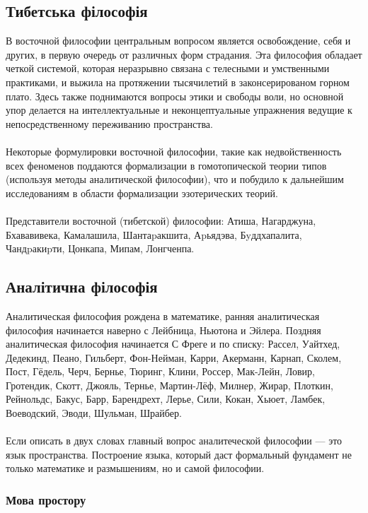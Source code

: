\subsection{Тибетська філософія}

В восточной философии центральным вопросом является освобождение, себя и других, в первую очередь от различных форм страдания. Эта философия обладает четкой системой, которая неразрывно связана с телесными и умственными практиками, и выжила на протяжении тысячилетий в законсерированом горном плато. Здесь также поднимаются вопросы этики и свободы воли, но основной упор делается на интеллектуальные и неконцептуальные упражнения ведущие к непосредственному переживанию пространства.
\\
\\
Некоторые формулировки восточной философии, такие как недвойственность всех феноменов поддаются формализации в гомотопической теории типов (используя методы аналитической философии), что и побудило к дальнейшим исследованиям в области формализации эзотерических теорий.
\\
\\
Представители восточной (тибетской) философии: Атиша, Нагарджуна, Бхававивека, Камалашила, Шантаpакшита, Аpьядэва, Бyддхапалита, Чандpакиpти, Цонкапа, Мипам, Лонгченпа.

\subsection{Аналітична філософія}

Аналитическая философия рождена в математике, ранняя аналитическая философия начинается наверно с Лейбница, Ньютона и Эйлера. Поздняя аналитическая философия начинается С Фреге и по списку: Рассел, Уайтхед, Дедекинд, Пеано, Гильберт, Фон-Нейман, Карри, Акерманн, Карнап, Сколем, Пост, Гёдель, Черч, Бернье, Тюринг, Клини, Россер, Мак-Лейн, Ловир, Гротендик, Скотт, Джояль, Тернье, Мартин-Лёф, Милнер, Жирар, Плоткин, Рейнольдс, Бакус, Барр, Барендрехт, Лерье, Сили, Кокан, Хьюет, Ламбек, Воеводский, Эводи, Шульман, Шрайбер.
\\
\\
Если описать в двух словах главный вопрос аналитеческой философии --- это язык пространства. Построение языка, который даст формальный фундамент не только математике и размышениям, но и самой философии.
\\

\subsubsection{Мова простору}

